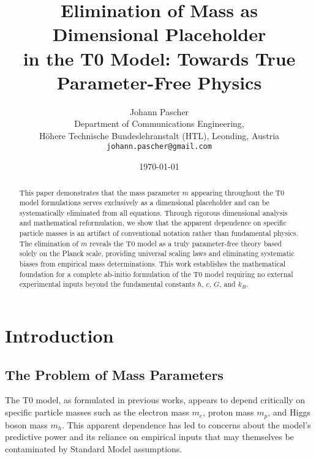 \documentclass[12pt,a4paper]{article}
\begin{document}
	
	\title{Elimination of Mass as Dimensional Placeholder \\
		in the T0 Model: Towards True Parameter-Free Physics}
	\author{Johann Pascher\\
		Department of Communications Engineering, \\Höhere Technische Bundeslehranstalt (HTL), Leonding, Austria\\
		\texttt{johann.pascher@gmail.com}}
	\date{\today}
	
	\maketitle
	
	\begin{abstract}
		This paper demonstrates that the mass parameter $m$ appearing throughout the T0 model formulations serves exclusively as a dimensional placeholder and can be systematically eliminated from all equations. Through rigorous dimensional analysis and mathematical reformulation, we show that the apparent dependence on specific particle masses is an artifact of conventional notation rather than fundamental physics. The elimination of $m$ reveals the T0 model as a truly parameter-free theory based solely on the Planck scale, providing universal scaling laws and eliminating systematic biases from empirical mass determinations. This work establishes the mathematical foundation for a complete ab-initio formulation of the T0 model requiring no external experimental inputs beyond the fundamental constants $\hbar$, $c$, $G$, and $k_B$.
	\end{abstract}
	
	\tableofcontents
	\newpage
	
	\section{Introduction}
	\label{sec:introduction}
	
	\subsection{The Problem of Mass Parameters}
	\label{subsec:mass_problem}
	
	The T0 model, as formulated in previous works, appears to depend critically on specific particle masses such as the electron mass $m_e$, proton mass $m_p$, and Higgs boson mass $m_h$. This apparent dependence has led to concerns about the model's predictive power and its reliance on empirical inputs that may themselves be contaminated by Standard Model assumptions.
	
\end{document}
